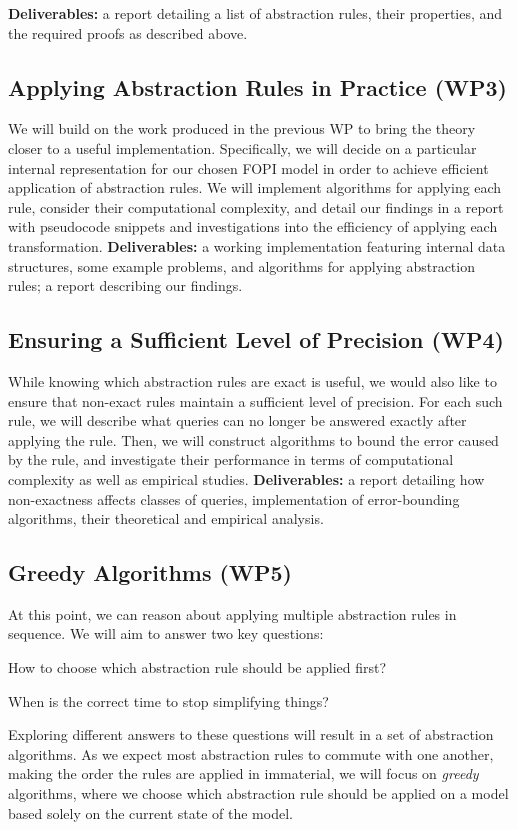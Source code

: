 \documentclass[11pt,english,twocolumn]{article}
\begin{document}
\textbf{Deliverables:} a report detailing a list of abstraction rules, their
properties, and the required proofs as described above.

\subsection*{Applying Abstraction Rules in Practice (WP3)}

We will build on the work produced in the previous WP to bring the theory closer
to a useful implementation. Specifically, we will decide on a particular
internal representation for our chosen FOPI model in order to achieve efficient
application of abstraction rules. We will implement algorithms for applying each
rule, consider their computational complexity, and detail our findings in a
report with pseudocode snippets and investigations into the efficiency of
applying each transformation. \textbf{Deliverables:} a working implementation
featuring internal data structures, some example problems, and algorithms for
applying abstraction rules; a report describing our findings.

\subsection*{Ensuring a Sufficient Level of Precision (WP4)}

While knowing which abstraction rules are exact is useful, we would also
like to ensure that non-exact rules maintain a sufficient level of precision.
For each such rule, we will describe what queries can no longer be answered
exactly after applying the rule. Then, we will construct algorithms to bound the
error caused by the rule, and investigate their performance in terms of
computational complexity as well as empirical studies. \textbf{Deliverables:} a
report detailing how non-exactness affects classes of queries, implementation of
error-bounding algorithms, their theoretical and empirical analysis.

\subsection*{Greedy Algorithms (WP5)}

At this point, we can reason about applying multiple abstraction rules in
sequence. We will aim to answer two key questions:
\begin{itemize*}
\item How to choose which abstraction rule should be applied first?
\item When is the correct time to stop simplifying things?
\end{itemize*}
Exploring different answers to these questions will result in a set of
abstraction algorithms. As we expect most abstraction rules to commute with one
another, making the order the rules are applied in immaterial, we will focus on
\emph{greedy} algorithms, where we choose which abstraction rule should be
applied on a model based solely on the current state of the model.
\end{document}
